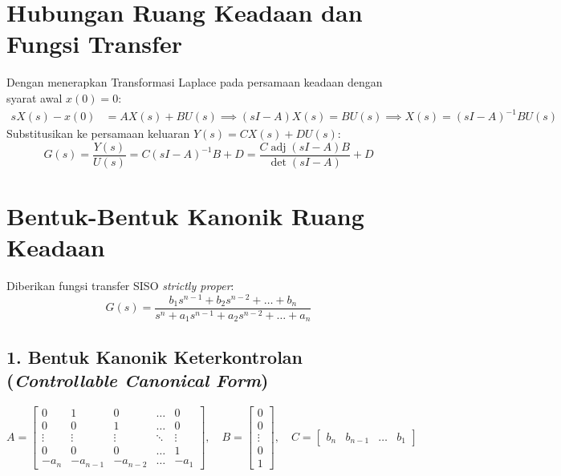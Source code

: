 \documentclass[11pt,a4paper]{article}
\begin{document}
\vspace{6pt}

\section{Hubungan Ruang Keadaan dan Fungsi Transfer}

Dengan menerapkan Transformasi Laplace pada persamaan keadaan dengan syarat awal $x(0) = 0$:
\begin{align*}
    s X(s) - x(0) &= A X(s) + B U(s) \implies (sI - A) X(s) = B U(s) \implies X(s) = (sI - A)^{-1} B U(s)
\end{align*}
Substitusikan ke persamaan keluaran $Y(s) = C X(s) + D U(s)$:
\begin{equation*}
    G(s) = \frac{Y(s)}{U(s)} = C(sI - A)^{-1}B + D = \frac{C \operatorname{adj}(sI - A) B}{\det(sI - A)} + D
\end{equation*}

\vspace{6pt}

\section{Bentuk-Bentuk Kanonik Ruang Keadaan}

Diberikan fungsi transfer SISO \textit{strictly proper}:
\begin{equation*}
    G(s) = \frac{b_1 s^{n-1} + b_2 s^{n-2} + \dots + b_n}{s^n + a_1 s^{n-1} + a_2 s^{n-2} + \dots + a_n}
\end{equation*}

\subsection{1. Bentuk Kanonik Keterkontrolan (\textit{Controllable Canonical Form})}
\begin{equation*}
    A = \begin{bmatrix}
        0 & 1 & 0 & \dots & 0 \\
        0 & 0 & 1 & \dots & 0 \\
        \vdots & \vdots & \vdots & \ddots & \vdots \\
        0 & 0 & 0 & \dots & 1 \\
        -a_n & -a_{n-1} & -a_{n-2} & \dots & -a_1
    \end{bmatrix}, \quad
    B = \begin{bmatrix} 0 \\ 0 \\ \vdots \\ 0 \\ 1 \end{bmatrix}, \quad
    C = \begin{bmatrix} b_n & b_{n-1} & \dots & b_1 \end{bmatrix}
\end{equation*}
\end{document}
